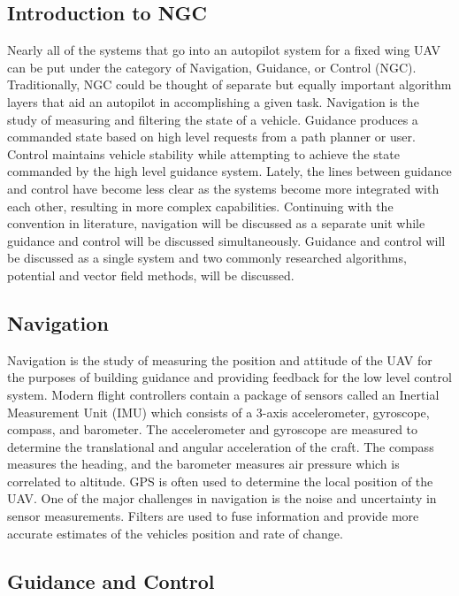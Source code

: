 \documentclass[numbered,pdftex]{ohio-etd}
\begin{document}
\subsection{Introduction to NGC}
Nearly all of the systems that go into an autopilot system for a fixed wing UAV can be put under the category of Navigation, Guidance, or Control (NGC). Traditionally, NGC could be thought of separate but equally important algorithm layers that aid an autopilot in accomplishing a given task. Navigation is the study of measuring and filtering the state of a vehicle. Guidance produces a commanded state based on high level requests from a path planner or user. Control maintains vehicle stability while attempting to achieve the state commanded by the high level guidance system. Lately, the lines between guidance and control have become less clear as the systems become more integrated with each other, resulting in more complex capabilities. Continuing with the convention in literature, navigation will be discussed as a separate unit while guidance and control will be discussed simultaneously. Guidance and control will be discussed as a single system and two commonly researched algorithms, potential and vector field methods, will be discussed.


\subsection{Navigation}

Navigation is the study of measuring the position and attitude of the UAV for the purposes of building guidance and providing feedback for the low level control system. Modern flight controllers contain a package of sensors called an Inertial Measurement Unit (IMU) which consists of a 3-axis accelerometer, gyroscope, compass, and barometer. The accelerometer and gyroscope are measured to determine the translational and angular acceleration of the craft. The compass measures the heading, and the barometer measures air pressure which is correlated to altitude. GPS is often used to determine the local position of the UAV. One of the major challenges in navigation is the noise and uncertainty in sensor measurements. Filters are used to fuse information and provide more accurate estimates of the vehicles position and rate of change.


\subsection{Guidance and Control}
\end{document}
